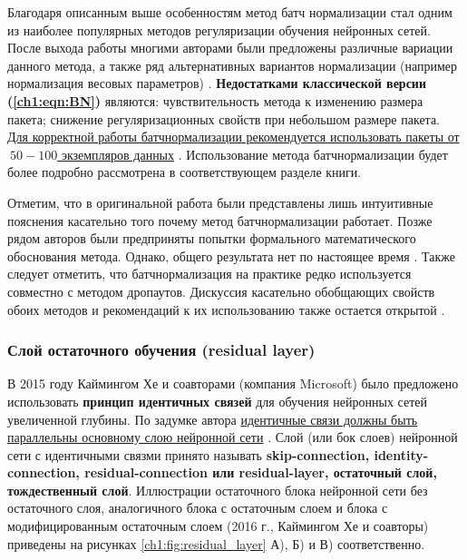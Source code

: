 \documentclass[12pt]{article}
\begin{document}
\begin{sloppypar}
\begin{itemize}
\end{itemize}
Благодаря описанным выше особенностям метод батч нормализации стал одним из наиболее популярных методов регуляризации обучения нейронных сетей. После выхода работы \cite{ioffe2015batch} многими авторами были предложены различные вариации данного метода, а также ряд альтернативных вариантов нормализации (например нормализация весовых параметров) \cite{moradi2020survey, huang2020normalization, summers2019four}. \textbf{Недостатками классической версии (\ref{ch1:eqn:BN})} являются: чувствительность метода к изменению размера пакета; снижение регуляризационных свойств при небольшом размере пакета. \uline{Для корректной работы батчнормализации рекомендуется использовать пакеты от $~50-100$ экземпляров данных} \cite{zhang2021dive}. Использование метода батчнормализации будет более подробно рассмотрена в соответствующем разделе книги. 

Отметим, что в оригинальной работа \cite{ioffe2015batch} были представлены лишь интуитивные пояснения касательно того почему метод батчнормализации работает. Позже рядом авторов были предприняты попытки формального математического обоснования метода. Однако, общего результата нет по настоящее время \cite{lubana2021beyond, luo2018towards}. Также следует отметить, что батчнормализация на практике редко используется совместно с методом дропаутов. Дискуссия касательно обобщающих свойств обоих методов и рекомендаций к их использованию также остается открытой \cite{li2019understanding, zhang2021dive}. 

\subsubsection{Слой остаточного обучения (residual layer)}
В 2015 году Каймингом Хе и соавторами (компания Microsoft) было предложено использовать \textbf{принцип идентичных связей} для обучения нейронных сетей увеличенной глубины. По задумке автора \uline{идентичные связи должны быть параллельны основному слою нейронной сети} \cite{he2016deep}. 
Слой (или бок слоев) нейронной сети с идентичными связми принято называть \textbf{skip-connection, identity-connection, residual-connection или residual-layer, остаточный слой, тождественный слой}. Иллюстрации остаточного блока нейронной сети без остаточного слоя, аналогичного блока с остаточным слоем \cite{he2016deep} и блока с модифицированным остаточным слоем \cite{he2016identity} (2016 г., Каймингом Хе и соавторы) приведены на рисунках \ref{ch1:fig:residual_layer} А), Б) и В) соответственно.


\end{sloppypar}
\end{document}
